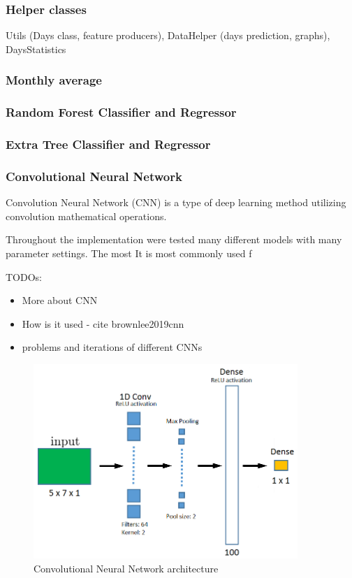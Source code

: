 \documentclass{article}
\begin{document}
\subsubsection{Helper classes}
Utils (Days class, feature producers), DataHelper (days prediction, graphs), DaysStatistics
\subsubsection{Monthly average}
\subsubsection{Random Forest Classifier and Regressor}
\subsubsection{Extra Tree Classifier and Regressor}
\subsubsection{Convolutional Neural Network}
Convolution Neural Network (CNN) is a type of deep learning method utilizing convolution mathematical operations. 

Throughout the implementation were tested many different models with many parameter settings. The most 
It is most commonly used f

\color{red}
TODOs:
\begin{itemize}
    \item More about CNN
    \item How is it used - cite brownlee2019cnn
    \item problems and iterations of different CNNs
\end{itemize}
\color{black}

\begin{figure}[h!]
\centering
\includegraphics[width=10cm]{imgs/cnn}
\caption{Convolutional Neural Network architecture}
\label{fig:cnn}
\end{figure}
\end{document}
